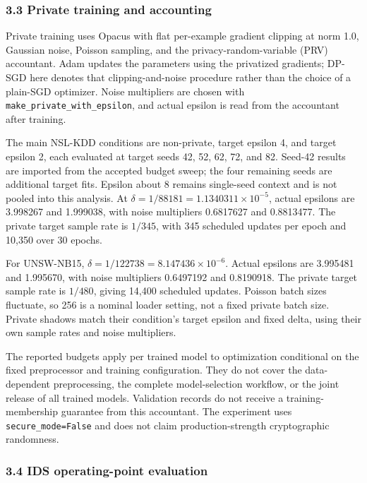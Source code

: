 \documentclass[11pt,a4paper]{article}
\begin{document}
\hypertarget{private-training-and-accounting}{%
\subsubsection{3.3 Private training and
accounting}\label{private-training-and-accounting}}

Private training uses Opacus with flat per-example gradient clipping at
norm 1.0, Gaussian noise, Poisson sampling, and the
privacy-random-variable (PRV) accountant. Adam updates the parameters
using the privatized gradients; DP-SGD here denotes that
clipping-and-noise procedure rather than the choice of a plain-SGD
optimizer. Noise multipliers are chosen with
\texttt{make\_private\_with\_epsilon}, and actual epsilon is read from
the accountant after training.

The main NSL-KDD conditions are non-private, target epsilon 4, and
target epsilon 2, each evaluated at target seeds 42, 52, 62, 72, and 82.
Seed-42 results are imported from the accepted budget sweep; the four
remaining seeds are additional target fits. Epsilon about 8 remains
single-seed context and is not pooled into this analysis. At
\(\delta=1/88181=1.1340311\times10^{-5}\), actual epsilons are 3.998267
and 1.999038, with noise multipliers 0.6817627 and 0.8813477. The
private target sample rate is \(1/345\), with 345 scheduled updates per
epoch and 10,350 over 30 epochs.

For UNSW-NB15, \(\delta=1/122738=8.147436\times10^{-6}\). Actual
epsilons are 3.995481 and 1.995670, with noise multipliers 0.6497192 and
0.8190918. The private target sample rate is \(1/480\), giving 14,400
scheduled updates. Poisson batch sizes fluctuate, so 256 is a nominal
loader setting, not a fixed private batch size. Private shadows match
their condition's target epsilon and fixed delta, using their own sample
rates and noise multipliers.

The reported budgets apply per trained model to optimization conditional
on the fixed preprocessor and training configuration. They do not cover
the data-dependent preprocessing, the complete model-selection workflow,
or the joint release of all trained models. Validation records do not
receive a training-membership guarantee from this accountant. The
experiment uses \texttt{secure\_mode=False} and does not claim
production-strength cryptographic randomness.

\hypertarget{ids-operating-point-evaluation}{%
\subsubsection{3.4 IDS operating-point
evaluation}\label{ids-operating-point-evaluation}}
\end{document}
